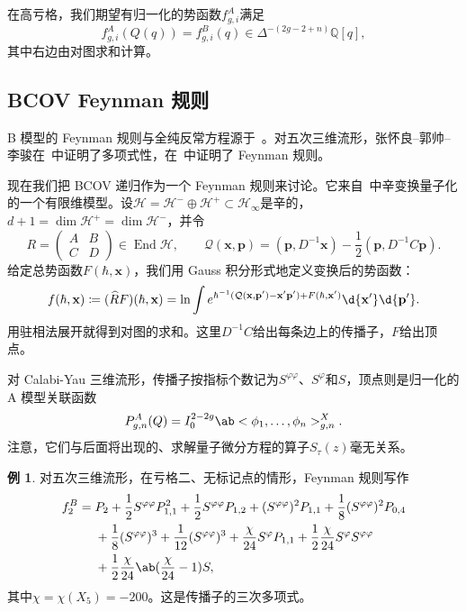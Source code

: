 \documentclass{amsart}
\theoremstyle{definition}
\newtheorem{exm}[thm]{例}
\theoremstyle{remark}
\theoremstyle{plain}
\theoremstyle{definition}
\theoremstyle{remark}
\newcommand{\Q}{\mathbb{Q}}
\newcommand{\mc}[1]{\mathcal{#1}}
\newcommand{\mbf}[1]{\mathbf{#1}}
\newcommand{\bp}{\mbf{p}}
\newcommand{\wh}[1]{\widehat{#1}}
\newcommand{\1}{\mathbf{1}}
\newcommand{\2}{\mathbf{2}}
\newcommand{\3}{\mathbf{3}}
\DeclareMathOperator{\End}{End}
\begin{document}
在高亏格，我们期望有归一化的势函数\(f^A_{g,i}\)满足
\[ f^A_{g,i}(Q(q)) = f^B_{g,i}(q) \in \Delta^{-(2g-2+n)}\Q[q], \]
其中右边由对图求和计算。

\subsection{BCOV Feynman 规则}%
\label{sub:The BCOV Feynman rule}

B 模型的 Feynman 规则与全纯反常方程源于~\cite{BCOV1994}。对五次三维流形，张怀良--郭帅--李骏在~\cite{CGL2021}中证明了多项式性，在~\cite{CGL2026}中证明了 Feynman 规则。

现在我们把 BCOV 递归作为一个 Feynman 规则来讨论。它来自~中辛变换量子化的一个有限维模型。设\(\mc{H} = \mc{H}^- \oplus \mc{H}^+ \subset \mc{H}_{\infty}\)是辛的，\(d+1 = \dim \mc{H}^+ = \dim \mc{H}^-\)，并令
\[ R = \begin{pmatrix} A & B \\ C & D \end{pmatrix} \in \End \mc{H}, \qquad \mc{Q}(\mbf{x},\bp) = (\bp, D^{-1}\mbf{x}) - \frac{1}{2}(\bp, D^{-1}C\bp). \]
给定总势函数\(F(\hbar, \mbf{x})\)，我们用 Gauss 积分形式地定义变换后的势函数：
\[ f(\hbar, \mbf{x}) \coloneqq (\wh{R}F)(\hbar,\mbf{x}) = \ln \int e^{\hbar^{-1}(\mc{Q}(\mbf{x},\bp') - \mbf{x}'\bp') + F(\hbar,\mbf{x}')}\d{\mbf{x}'}\d{\bp'}. \]
用驻相法展开就得到对图的求和。这里\(D^{-1}C\)给出每条边上的传播子，\(F\)给出顶点。

对 Calabi-Yau 三维流形，传播子按指标个数记为\(S^{\varphi\varphi}\)、\(S^{\varphi}\)和\(S\)，顶点则是归一化的 A 模型关联函数
\[ P^A_{g,n}(Q) = I_0^{2-2g}\ab<\phi_1, \ldots, \phi_n>^X_{g,n}. \]
注意，它们与后面将出现的、求解量子微分方程的算子\(S_{\tau}(z)\)毫无关系。

\begin{exm}
    对五次三维流形，在亏格二、无标记点的情形，Feynman 规则写作
    \begin{align*}
        f_2^B ={}& P_2 + \frac{1}{2}S^{\varphi\varphi}P_{1,1}^2 + \frac{1}{2}S^{\varphi\varphi}P_{1,2} + (S^{\varphi\varphi})^2 P_{1,1} + \frac{1}{8}(S^{\varphi\varphi})^2 P_{0,4} \\
        &+ \frac{1}{8}(S^{\varphi\varphi})^3 + \frac{1}{12}(S^{\varphi\varphi})^3 + \frac{\chi}{24}S^{\varphi}P_{1,1} + \frac{1}{2}\frac{\chi}{24}S^{\varphi}S^{\varphi\varphi} \\
        &+ \frac{1}{2}\frac{\chi}{24}\ab(\frac{\chi}{24}-1)S,
    \end{align*}
    其中\(\chi = \chi(X_5) = -200\)。这是传播子的三次多项式。
\end{exm}
\end{document}
